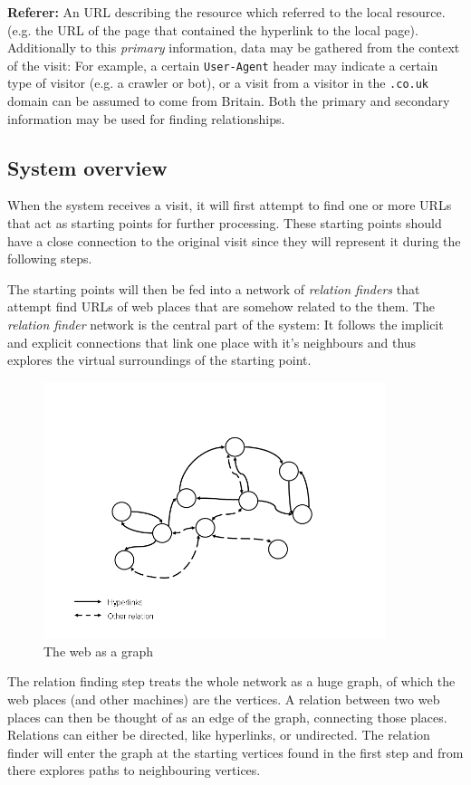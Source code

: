 \documentclass[a4paper]{danarticle}
\theoremstyle{remark}
\begin{document}
    \textbf{Referer:} An URL describing the resource which referred to the local 
    resource. (e.g. the URL of the page that contained the hyperlink to the 
    local page).
    \\
    
    Additionally to
    this \textit{primary} information, data may be gathered from the
    context of the visit: For example, a certain \verb$User-Agent$ header 
    may indicate a certain type of visitor (e.g. a crawler or bot), or a visit
    from a visitor in the \verb$.co.uk$ domain can be assumed to come from
    Britain. Both the primary and secondary information may be used for finding
    relationships.
    \subsection{System overview}
      When the system receives a visit, it will first attempt to find one or 
      more URLs that act as starting points for further processing. These 
      starting points should have a close connection to the original visit since 
      they will represent it during the following steps.
      
      The starting points will then be fed into a network of \textit{relation 
      finders} that attempt find URLs of web places that are somehow related to 
      the them. The \textit{relation finder} network is the central part of the 
      system: It follows the implicit and explicit connections that link one 
      place with it's neighbours and thus explores the virtual surroundings of 
      the starting point. 
      
      \begin{figure}[ht]
        \centering
        \includegraphics[width=10cm]{webgraph}
        \caption{The web as a graph}
        \label{webgraph}
      \end{figure}
      The relation finding step treats the whole network as a huge graph, of
      which the web places (and other machines) are the vertices. A relation
      between two web places can then be thought of as an edge of the graph,
      connecting those places. Relations can either be directed, like
      hyperlinks, or undirected. The relation finder will enter the graph at the
      starting vertices found in the first step and from there explores paths to
      neighbouring vertices.
      
\end{document}
